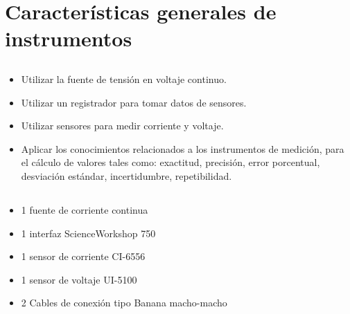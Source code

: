 \chapter{Características generales de instrumentos}
\section{\obj}
\capacidad
\begin{itemize}
\item Utilizar la fuente de tensión en voltaje continuo.
\item Utilizar un registrador para tomar datos de sensores.
\item Utilizar sensores para medir corriente y voltaje.
\item Aplicar los conocimientos relacionados a los instrumentos de medición, para el cálculo de valores tales como: exactitud, precisión, error porcentual, desviación estándar, incertidumbre, repetibilidad.
\end{itemize}

\section{\mat}
\begin{itemize}
\item 1 fuente de corriente continua
\item 1 interfaz ScienceWorkshop\,\textsuperscript{\textregistered}\,750
\item 1 sensor de corriente CI-6556
\item 1 sensor de voltaje UI-5100
\item 2 Cables de conexión tipo Banana macho-macho
\end{itemize}


